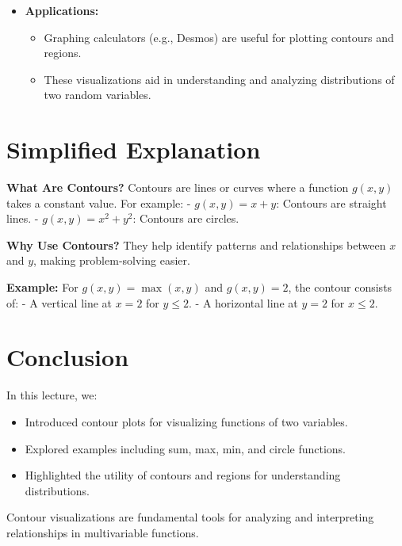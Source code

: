 \documentclass{article}
\begin{document}
\begin{itemize}
  \item \textbf{Applications:}
    \begin{itemize}
      \item Graphing calculators (e.g., Desmos) are useful for plotting contours and regions.
      \item These visualizations aid in understanding and analyzing distributions of two random variables.
    \end{itemize}
\end{itemize}

\section*{Simplified Explanation}

\textbf{What Are Contours?}
Contours are lines or curves where a function $g(x, y)$ takes a constant value. For example:
- $g(x, y) = x + y$: Contours are straight lines.
- $g(x, y) = x^2 + y^2$: Contours are circles.

\textbf{Why Use Contours?}
They help identify patterns and relationships between $x$ and $y$, making problem-solving easier.

\textbf{Example:}
For $g(x, y) = \max(x, y)$ and $g(x, y) = 2$, the contour consists of:
- A vertical line at $x = 2$ for $y \leq 2$.
- A horizontal line at $y = 2$ for $x \leq 2$.

\section*{Conclusion}

In this lecture, we:
\begin{itemize}
  \item Introduced contour plots for visualizing functions of two variables.
  \item Explored examples including sum, max, min, and circle functions.
  \item Highlighted the utility of contours and regions for understanding distributions.
\end{itemize}

Contour visualizations are fundamental tools for analyzing and interpreting relationships in multivariable functions.
\end{document}

